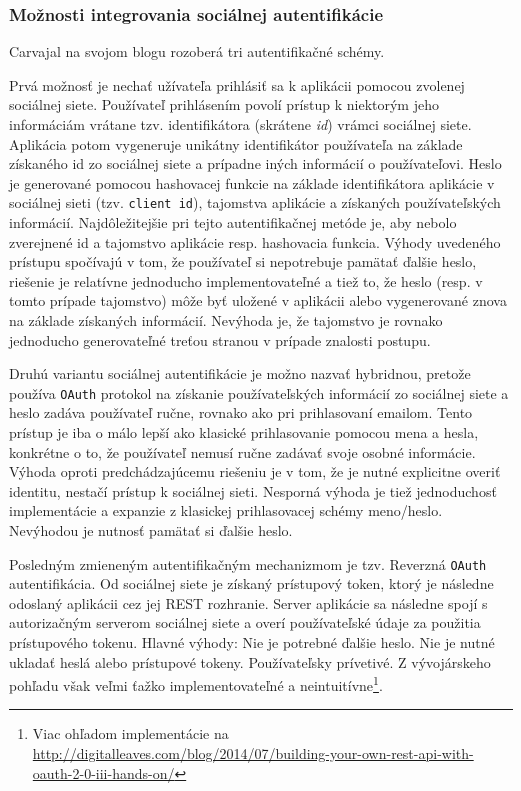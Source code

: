 \documentclass[12pt,oneside]{fithesis2}
\begin{document}
      		\subsubsection{Možnosti integrovania sociálnej autentifikácie}
      		Carvajal na svojom blogu rozoberá tri autentifikačné schémy. 
      		\par Prvá možnosť je nechať užívateľa prihlásiť sa k aplikácii pomocou zvolenej sociálnej siete. Používateľ prihlásením povolí prístup k niektorým jeho informáciám vrátane tzv. identifikátora (skrátene \textit{id}) vrámci sociálnej siete. Aplikácia potom vygeneruje unikátny identifikátor používateľa na základe získaného id zo sociálnej siete a prípadne iných informácií o používateľovi. Heslo je generované pomocou hashovacej funkcie na základe identifikátora aplikácie v sociálnej sieti (tzv. \texttt{client id}), tajomstva aplikácie a získaných používateľských informácií. Najdôležitejšie pri tejto autentifikačnej metóde je, aby nebolo zverejnené id a tajomstvo aplikácie resp. hashovacia funkcia. Výhody uvedeného prístupu spočívajú v tom, že používateľ si nepotrebuje pamätať ďalšie heslo, riešenie je relatívne jednoducho implementovateľné a tiež to, že heslo (resp. v tomto prípade tajomstvo) môže byť uložené v aplikácii alebo vygenerované znova na základe získaných informácií. Nevýhoda je, že tajomstvo je rovnako jednoducho generovateľné treťou stranou v prípade znalosti postupu.
      		\par Druhú variantu sociálnej autentifikácie je možno nazvať hybridnou, pretože používa \texttt{OAuth} protokol na získanie používateľských informácií zo sociálnej siete a heslo zadáva používateľ ručne, rovnako ako pri prihlasovaní emailom. Tento prístup je iba o málo lepší ako klasické prihlasovanie pomocou mena a hesla, konkrétne o to, že používateľ nemusí ručne zadávať svoje osobné informácie. Výhoda oproti predchádzajúcemu riešeniu je v tom, že je nutné explicitne overiť identitu, nestačí prístup k sociálnej sieti. Nesporná výhoda je tiež jednoduchosť implementácie a expanzie z klasickej prihlasovacej schémy meno/heslo. Nevýhodou je nutnosť pamätať si ďalšie heslo.
      		\par Posledným zmieneným autentifikačným mechanizmom je tzv. Reverzná \texttt{OAuth} autentifikácia. Od sociálnej siete je získaný prístupový token, ktorý je následne odoslaný aplikácii cez jej REST rozhranie. Server aplikácie sa následne spojí s autorizačným serverom sociálnej siete a overí používateľské údaje za použitia prístupového tokenu. Hlavné výhody: Nie je potrebné ďalšie heslo. Nie je nutné ukladať heslá alebo prístupové tokeny. Používateľsky prívetivé. Z vývojárskeho pohľadu však veľmi ťažko implementovateľné a neintuitívne\footnote{Viac ohľadom implementácie na \url{http://digitalleaves.com/blog/2014/07/building-your-own-rest-api-with-oauth-2-0-iii-hands-on/} }.
      		\pagebreak
      		
\end{document}
